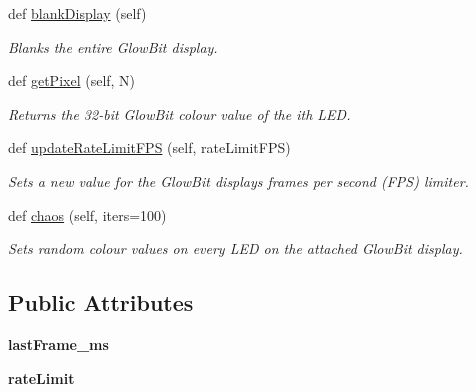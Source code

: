 \begin{DoxyCompactItemize}
def \hyperlink{classglowbit_1_1glowbit_ad3ace3e4d58bc9dadf62c1306aff2464}{blank\+Display} (self)
\begin{DoxyCompactList}\small\item\em Blanks the entire Glow\+Bit display. \end{DoxyCompactList}\item 
def \hyperlink{classglowbit_1_1glowbit_a0f15a8907f807ed1af905854fedbbc60}{get\+Pixel} (self, N)
\begin{DoxyCompactList}\small\item\em Returns the 32-\/bit Glow\+Bit colour value of the i\textquotesingle{}th L\+ED. \end{DoxyCompactList}\item 
def \hyperlink{classglowbit_1_1glowbit_a7f72cb0878a688aa6181d4632428da09}{update\+Rate\+Limit\+F\+PS} (self, rate\+Limit\+F\+PS)
\begin{DoxyCompactList}\small\item\em Sets a new value for the Glow\+Bit display\textquotesingle{}s frames per second (F\+PS) limiter. \end{DoxyCompactList}\item 
def \hyperlink{classglowbit_1_1glowbit_ae95bb7e0ee556e02d918f376cffcb9ce}{chaos} (self, iters=100)
\begin{DoxyCompactList}\small\item\em Sets random colour values on every L\+ED on the attached Glow\+Bit display. \end{DoxyCompactList}\end{DoxyCompactItemize}
\subsection*{Public Attributes}
\begin{DoxyCompactItemize}
\item 
\mbox{\label{classglowbit_1_1glowbit_a5f14ddb9b3ec9a848c050b28d27ced9e}} 
{\bfseries last\+Frame\+\_\+ms}
\item 
\mbox{\label{classglowbit_1_1glowbit_a69bf20e5a054c0cf8656986b07048851}} 
{\bfseries rate\+Limit}
\end{DoxyCompactItemize}
